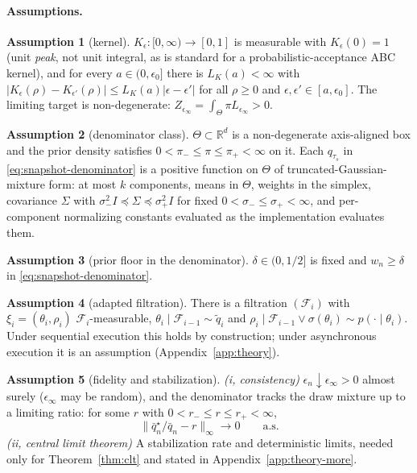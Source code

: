 \documentclass[pdflatex,sn-mathphys-num]{sn-jnl}
\theoremstyle{plain}
\theoremstyle{definition}
\newtheorem{assumption}{Assumption}
\begin{document}
\paragraph{Assumptions.}
\begin{assumption}[kernel]\label{ass:kernel} $K_\epsilon:[0,\infty)\to[0,1]$ is measurable with $K_\epsilon(0)=1$ (unit \emph{peak}, not unit integral, as is standard for a probabilistic-acceptance ABC kernel), and for every $a\in(0,\epsilon_0]$ there is $L_K(a)<\infty$ with $|K_\epsilon(\rho)-K_{\epsilon'}(\rho)|\le L_K(a)|\epsilon-\epsilon'|$ for all $\rho\ge0$ and $\epsilon,\epsilon'\in[a,\epsilon_0]$. The limiting target is non-degenerate: $Z_{\epsilon_\infty}=\int_\Theta\pi L_{\epsilon_\infty}>0$.\end{assumption}
\begin{assumption}[denominator class]\label{ass:class} $\Theta\subset\mathbb{R}^d$ is a non-degenerate axis-aligned box and the prior density satisfies $0<\pi_-\le\pi\le\pi_+<\infty$ on it. Each $q_{\tau_s}$ in \eqref{eq:snapshot-denominator} is a positive function on $\Theta$ of truncated-Gaussian-mixture form: at most $k$ components, means in $\Theta$, weights in the simplex, covariance $\Sigma$ with $\sigma_-^2I\preceq\Sigma\preceq\sigma_+^2I$ for fixed $0<\sigma_-\le\sigma_+<\infty$, and per-component normalizing constants evaluated as the implementation evaluates them.\end{assumption}
\begin{assumption}[prior floor in the denominator]\label{ass:defensive} $\delta\in(0,1/2]$ is fixed and $w_n\ge\delta$ in \eqref{eq:snapshot-denominator}.\end{assumption}
\begin{assumption}[adapted filtration]\label{ass:filtration} There is a filtration $(\mathcal{F}_i)$ with $\xi_i=(\theta_i,\rho_i)$ $\mathcal{F}_i$-measurable, $\theta_i\mid\mathcal{F}_{i-1}\sim\tilde q_i$ and $\rho_i\mid\mathcal{F}_{i-1}\vee\sigma(\theta_i)\sim p(\cdot\mid\theta_i)$. Under sequential execution this holds by construction; under asynchronous execution it is an assumption (Appendix~\ref{app:theory}).\end{assumption}
\begin{assumption}[fidelity and stabilization]\label{ass:stab} \emph{(i, consistency)} $\epsilon_n\downarrow\epsilon_\infty>0$ almost surely ($\epsilon_\infty$ may be random), and the denominator tracks the draw mixture up to a limiting ratio: for some $r$ with $0<r_-\le r\le r_+<\infty$,
\begin{equation}
\bigl\|\bar q^\star_n/\bar q_n-r\bigr\|_\infty\longrightarrow0\qquad\text{a.s.}
\label{eq:fidelity}
\end{equation}
\emph{(ii, central limit theorem)} A stabilization rate and deterministic limits, needed only for Theorem~\ref{thm:clt} and stated in Appendix~\ref{app:theory-more}.
\end{assumption}
\end{document}
